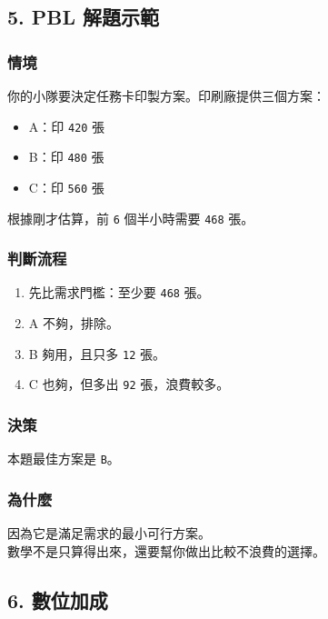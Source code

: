 \documentclass[
  chinese,
  12pt,
  a4paper,
  oneside]{article}
\providecommand{\tightlist}{%
  \setlength{\itemsep}{0pt}\setlength{\parskip}{0pt}}
\begin{document}
\subsection{5. PBL 解題示範}\label{pbl-ux89e3ux984cux793aux7bc4}

\subsubsection{情境}\label{ux60c5ux5883}

你的小隊要決定任務卡印製方案。印刷廠提供三個方案：

\begin{itemize}
\tightlist
\item
  A：印 \texttt{420} 張
\item
  B：印 \texttt{480} 張
\item
  C：印 \texttt{560} 張
\end{itemize}

根據剛才估算，前 \texttt{6} 個半小時需要 \texttt{468} 張。

\subsubsection{判斷流程}\label{ux5224ux65b7ux6d41ux7a0b}

\begin{enumerate}
\def\labelenumi{\arabic{enumi}.}
\tightlist
\item
  先比需求門檻：至少要 \texttt{468} 張。
\item
  A 不夠，排除。
\item
  B 夠用，且只多 \texttt{12} 張。
\item
  C 也夠，但多出 \texttt{92} 張，浪費較多。
\end{enumerate}

\subsubsection{決策}\label{ux6c7aux7b56}

本題最佳方案是 \texttt{B}。

\subsubsection{為什麼}\label{ux70baux4ec0ux9ebc}

因為它是滿足需求的最小可行方案。\\
數學不是只算得出來，還要幫你做出比較不浪費的選擇。

\subsection{6. 數位加成}\label{ux6578ux4f4dux52a0ux6210}
\end{document}
